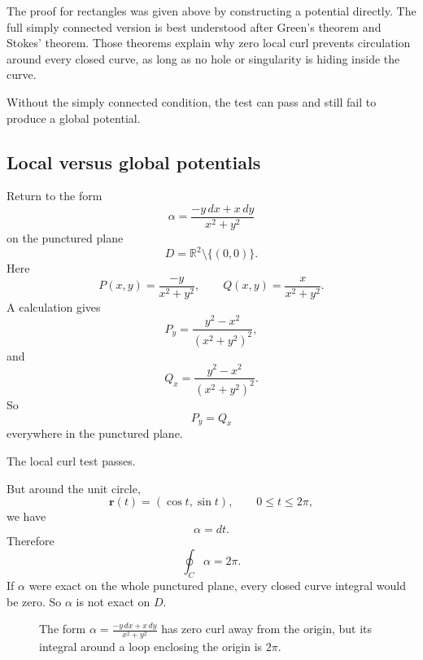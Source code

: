 The proof for rectangles was given above by constructing a potential directly.  The
full simply connected version is best understood after Green's theorem and Stokes'
theorem.  Those theorems explain why zero local curl prevents circulation around every
closed curve, as long as no hole or singularity is hiding inside the curve.

Without the simply connected condition, the test can pass and still fail to produce a
global potential.

\subsection{Local versus global potentials}

Return to the form
\[
    \alpha=\frac{-y\,dx+x\,dy}{x^2+y^2}
\]
on the punctured plane
\[
    D=\mathbb R^2\setminus\{(0,0)\}.
\]
Here
\[
    P(x,y)=\frac{-y}{x^2+y^2},
    \qquad
    Q(x,y)=\frac{x}{x^2+y^2}.
\]
A calculation gives
\[
    P_y=\frac{y^2-x^2}{(x^2+y^2)^2},
\]
and
\[
    Q_x=\frac{y^2-x^2}{(x^2+y^2)^2}.
\]
So
\[
    P_y=Q_x
\]
everywhere in the punctured plane.

The local curl test passes.

But around the unit circle,
\[
    \mathbf r(t)=(\cos t,\sin t),
    \qquad 0\le t\le2\pi,
\]
we have
\[
    \alpha=dt.
\]
Therefore
\[
\boxed{
    \oint_C \alpha=2\pi.
}
\]
If \(\alpha\) were exact on the whole punctured plane, every closed curve integral would
be zero.  So \(\alpha\) is not exact on \(D\).

\begin{figure}[h]
\centering
{}
\caption{The form \(\alpha=\frac{-y\,dx+x\,dy}{x^2+y^2}\) has zero curl away from the
origin, but its integral around a loop enclosing the origin is \(2\pi\).}
\end{figure}

